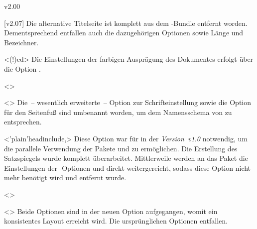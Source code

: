 \begin{Entity}{}
\begin{NoIndexDefault}
\begin{Cessations}{v2.00}
\begin{Cessation}
  {}
\begin{Cessation}
  {}
\begin{Cessation}
  {}
\begin{Cessation}
  {}
\printdeclarationlist
%
[v2.07]%
Die alternative Titelseite ist komplett aus dem \TUDScript-Bundle entfernt 
worden. Dementsprechend entfallen auch die dazugehörigen Optionen sowie Länge 
und Bezeichner.
\end{Cessation}
\end{Cessation}
\end{Cessation}
\end{Cessation}

\begin{Cessation}
  {}
  <\Option(!){cd}>
\printdeclarationlist
%
Die Einstellungen der farbigen Ausprägung des Dokumentes erfolgt über die 
Option .
\end{Cessation}

\begin{Cessation}
  {}
  <>
\begin{Cessation}
  {}
  <>
\printdeclarationlist
%
Die~-- wesentlich erweiterte~-- Option zur Schrifteinstellung sowie die Option 
für den Seitenfuß sind umbenannt worden, um dem Namensschema von \TUDScript zu 
entsprechen.
\end{Cessation}
\end{Cessation}

\begin{Cessation}
  {}
  <\Option'plain'{headinclude},>
\printdeclarationlist
%
Diese Option war für \TUDScript in der \emph{Version~v1.0} notwendig, um die 
parallele Verwendung der Pakete  und  zu 
ermöglichen. Die Erstellung des Satzspiegels wurde komplett überarbeitet. 
Mittlerweile werden an das Paket  die Einstellungen der 
\KOMAScript-Optionen  und  direkt 
weitergereicht, sodass diese Option nicht mehr benötigt wird und entfernt wurde.
\end{Cessation}

\begin{Cessation}
  {}
  <>
\begin{Cessation}
  {}
  <>
\printdeclarationlist
%
Beide Optionen sind in der neuen Option  
aufgegangen, womit ein konsistentes Layout erreicht wird. Die ursprünglichen 
Optionen entfallen. 
\end{Cessation}
\end{Cessation}


\end{Cessations}
\end{NoIndexDefault}
\end{Entity}
